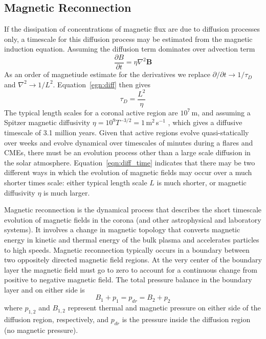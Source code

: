 \subsection{Magnetic Reconnection}\label{sec:13}

If the dissipation of concentrations of magnetic flux are due to diffusion processes only, a timescale for this diffusion process may be estimated from the magnetic induction equation. Assuming the diffusion term dominates over advection term
\begin{equation}
\frac{\partial B}{\partial t} = \eta\nabla^2\mathbf{B}
\label{egn:diff}
\end{equation}
As an order of magnetiude estimate for the derivatives we replace $\partial/\partial t \rightarrow 1/\tau_D$ and $\nabla^2 \rightarrow 1/L^2$. Equation~\ref{egn:diff} then gives
\begin{equation}
\tau_D = \frac{L^2}{\eta}
\label{eqn:diff_time}
\end{equation}
The typical length scales for a coronal active region are $10^7$\,m, and assuming a Spitzer magnetic diffusivity $\eta = 10^9T^{-3/2} = 1$\,m$^2$\,s$^{-1}$ \citep{spitzer1962}, which gives a diffusive timescale of 3.1 million years.
Given that active regions evolve quasi-statically over weeks and evolve dynamical over timescales of minutes during a flares and CMEs, there must be an evolution process other than a large scale diffusion in the solar atmosphere. Equation~\ref{eqn:diff_time} indicates that there may be two different ways in which the evolution of magnetic fields may occur over a much shorter times scale: either typical length scale $L$ is much shorter, or magnetic diffusivity $\eta$ is much larger.

Magnetic reconnection is the dynamical process that describes the short timescale evolution of magnetic fields in the corona (and other astrophysical and laboratory systems). It involves a change in magnetic topology that converts magnetic energy in kinetic and thermal energy of the bulk plasma and accelerates particles to high speeds. Magnetic reconnection typically occurs in a boundary between two oppositely directed magnetic field regions. At the very center of the boundary layer the magnetic field must go to zero to account for a continuous change from positive to negative magnetic field. The total pressure balance in the boundary layer and on either side is 
\begin{equation}
B_1 + p_1 = p_{dr} = B_2 + p_2
\end{equation}
where $p_{1,2}$ and $B_{1,2}$ represent thermal and magnetic pressure on either side of the diffusion region, respectively, and $p_{dr}$ is the pressure inside the diffusion region (no magnetic pressure).


